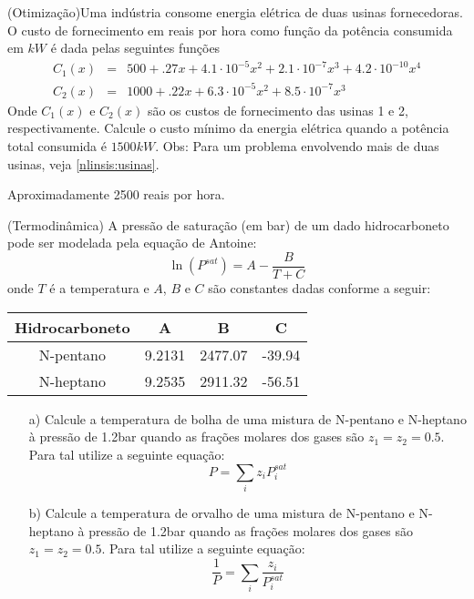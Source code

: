 \begin{exer}(Otimização)\label{1d:usinas}Uma indústria consome energia elétrica de duas usinas fornecedoras. O custo de fornecimento em reais por hora como função da potência consumida em $kW$ é dada pelas seguintes funções
\begin{eqnarray}
C_1(x)&=& 500+.27 x + 4.1\cdot 10^{-5}x^2 +2.1\cdot 10^{-7}x^3+4.2\cdot 10^{-10}x^4 \\
C_2(x)&=& 1000+.22 x + 6.3\cdot 10^{-5}x^2 +8.5\cdot 10^{-7}x^3
\end{eqnarray}
Onde $C_1(x)$ e $C_2(x)$ são os custos de fornecimento das usinas 1 e 2, respectivamente. Calcule o custo mínimo da energia elétrica quando a potência total consumida é  $1500kW$. Obs: Para um problema envolvendo mais de duas usinas, veja \ref{nlinsis:usinas}.
\end{exer}
\begin{resp}

 Aproximadamente 2500 reais por hora.

\end{resp}

\begin{exer}(Termodinâmica) A pressão de saturação (em bar) de um dado hidrocarboneto pode ser modelada pela equação de Antoine:
\begin{equation} \ln\left(P^{sat}\right)=A-\frac{B}{T+C} \end{equation}
onde $T$ é a temperatura e $A$, $B$ e $C$ são constantes dadas conforme a seguir:

\begin{tabular}{|c|c|c|c|}
\hline
Hidrocarboneto&A&B&C\\
\hline
N-pentano & 9.2131 & 2477.07 & -39.94 \\
\hline
N-heptano & 9.2535 &2911.32 &-56.51 \\
\hline
\end{tabular}
\begin{itemize}
\item[a)] Calcule a temperatura de bolha de uma mistura de N-pentano e N-heptano à pressão de 1.2bar quando as frações molares  dos gases são  $z_1=z_2=0.5$. Para tal utilize a seguinte equação:
\begin{equation} P=\sum_i z_i P_i^{sat} \end{equation}
\item[b)] Calcule a temperatura de orvalho de uma mistura de N-pentano e N-heptano à pressão de 1.2bar quando as frações molares  dos gases são  $z_1=z_2=0.5$. Para tal utilize a seguinte equação:
\begin{equation} \frac{1}{P}=\sum_i \frac{z_i}{P_i^{sat}} \end{equation}
\end{itemize}
\end{exer}

